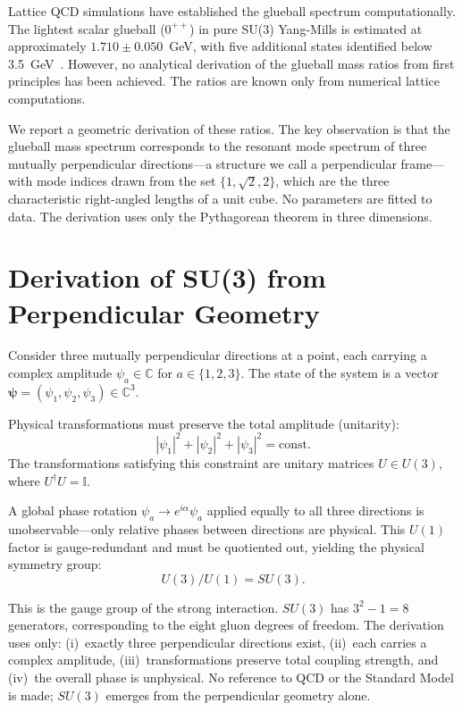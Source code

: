 \documentclass[aps,prd,twocolumn,superscriptaddress,nofootinbib]{revtex4-2}
\begin{document}
Lattice QCD simulations have established the glueball spectrum
computationally. The lightest scalar glueball ($0^{++}$) in pure
SU(3) Yang-Mills is estimated at approximately
$1.710 \pm 0.050$~GeV, with five additional states identified below
3.5~GeV~\cite{Morningstar1999,Chen2006,Athenodorou2021}. However, no
analytical derivation of the glueball mass ratios from first
principles has been achieved. The ratios are known only from numerical
lattice computations.

We report a geometric derivation of these ratios. The key observation
is that the glueball mass spectrum corresponds to the resonant mode
spectrum of three mutually perpendicular directions---a structure we
call a perpendicular frame---with mode indices drawn from the set
$\{1, \sqrt{2}, 2\}$, which are the three characteristic right-angled
lengths of a unit cube. No parameters are fitted to data. The
derivation uses only the Pythagorean theorem in three dimensions.

\section{Derivation of SU(3) from Perpendicular Geometry}
\label{sec:su3}

Consider three mutually perpendicular directions at a point, each
carrying a complex amplitude $\psi_a \in \mathbb{C}$ for
$a \in \{1, 2, 3\}$. The state of the system is a vector
$\boldsymbol{\psi} = (\psi_1, \psi_2, \psi_3) \in \mathbb{C}^3$.

Physical transformations must preserve the total amplitude
(unitarity):
\begin{equation}
|\psi_1|^2 + |\psi_2|^2 + |\psi_3|^2 = \text{const.}
\end{equation}
The transformations satisfying this constraint are unitary matrices
$U \in U(3)$, where $U^\dagger U = \mathbb{I}$.

A global phase rotation $\psi_a \to e^{i\alpha}\psi_a$ applied
equally to all three directions is unobservable---only relative phases
between directions are physical. This $U(1)$ factor is gauge-redundant
and must be quotiented out, yielding the physical symmetry group:
\begin{equation}
U(3)/U(1) = SU(3).
\label{eq:su3}
\end{equation}

This is the gauge group of the strong interaction. $SU(3)$ has
$3^2 - 1 = 8$ generators, corresponding to the eight gluon degrees
of freedom. The derivation uses only: (i)~exactly three perpendicular
directions exist, (ii)~each carries a complex amplitude,
(iii)~transformations preserve total coupling strength, and (iv)~the
overall phase is unphysical. No reference to QCD or the Standard
Model is made; $SU(3)$ emerges from the perpendicular geometry alone.
\end{document}
